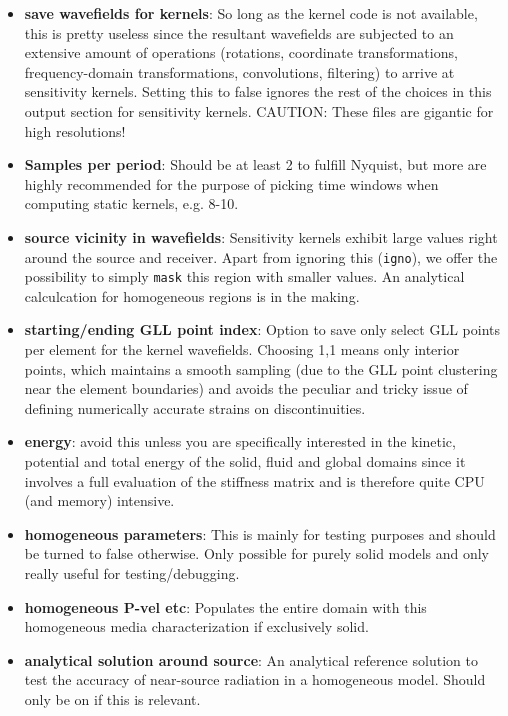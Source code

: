 \documentclass[11pt,letter,fleqn,english,notitlepage]{article}
\begin{document}
\begin{itemize}
\item \textbf{save wavefields for kernels}: So long as the kernel code is not available, this 
is pretty useless since the resultant wavefields are subjected to an extensive amount of operations 
(rotations, coordinate transformations, frequency-domain transformations, convolutions, filtering)
to arrive at sensitivity kernels. Setting this to false ignores the rest of the choices in this output 
section for sensitivity kernels. CAUTION: These files are gigantic for high resolutions!

\item \textbf{Samples per period}: Should be at least 2 to fulfill Nyquist, but more 
are highly recommended for the purpose of picking time windows when 
computing static kernels, e.g. 8-10.

\item \textbf{source vicinity in wavefields}: Sensitivity kernels exhibit large values right around 
the source and receiver. Apart from ignoring this ({\tt igno}), 
we offer the possibility to simply {\tt mask} this region with smaller values. 
An analytical calculcation for homogeneous regions is in the making.

\item \textbf{starting/ending GLL point index}: Option to save only select GLL points per element for the 
kernel wavefields. Choosing 1,1 means only interior points, which maintains a smooth sampling (due to the 
GLL point clustering near the element boundaries) and avoids the peculiar and tricky issue of defining 
numerically accurate strains on discontinuities.

\item  \textbf{energy}: avoid this unless you are specifically interested in the kinetic,
potential and total energy of the solid, fluid and global domains since it 
involves a full evaluation of the stiffness matrix and is therefore quite 
CPU (and memory) intensive. 

\item  \textbf{homogeneous parameters}: This is mainly for testing purposes and should be 
turned to false otherwise. Only possible for purely solid models 
and only really useful for testing/debugging.

\item \textbf{homogeneous P-vel etc}: Populates the entire domain with this 
homogeneous media characterization if exclusively solid.

\item \textbf{analytical solution around source}: An analytical reference solution to test the 
accuracy of near-source radiation in a homogeneous model. Should only be on if this is relevant.


\end{itemize}
\end{document}
